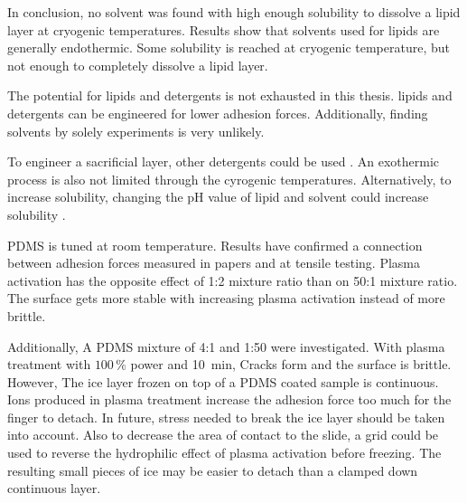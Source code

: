 
In conclusion, no solvent was found with high enough solubility to dissolve a lipid layer at cryogenic temperatures. Results show that solvents used for lipids are generally endothermic. Some solubility is reached at cryogenic temperature, but not enough to completely dissolve a lipid layer.

The potential for lipids and detergents is not exhausted in this thesis. lipids and detergents can be engineered for lower adhesion forces. Additionally, finding solvents by solely experiments is very unlikely. 

To engineer a sacrificial layer, other detergents could be used \cite{SigmaAldrich.2023}. An exothermic process is also not limited through the cyrogenic temperatures. Alternatively, to increase solubility, changing the pH value of lipid and solvent could increase solubility \cite{BruceA.AverillPatriciaEldredge.}.

PDMS is tuned at room temperature. Results have confirmed a connection between adhesion forces measured in papers and at tensile testing. Plasma activation has the opposite effect of 1:2 mixture ratio than on 50:1 mixture ratio. The surface gets more stable with increasing plasma activation instead of more brittle.

Additionally, A PDMS mixture of 4:1 and 1:50 were investigated. With plasma treatment with $100\,\%$ power and \SI{10}{\minute}, Cracks form and the surface is brittle. However, The ice layer frozen on top of a PDMS coated sample is continuous. Ions produced in plasma treatment increase the adhesion force too much for the finger to detach. In future, stress needed to break the ice layer should be taken into account. Also to decrease the area of contact to the slide, a grid could be used to reverse the hydrophilic effect of plasma activation before freezing. The resulting small pieces of ice may be easier to detach than a clamped down continuous layer.

